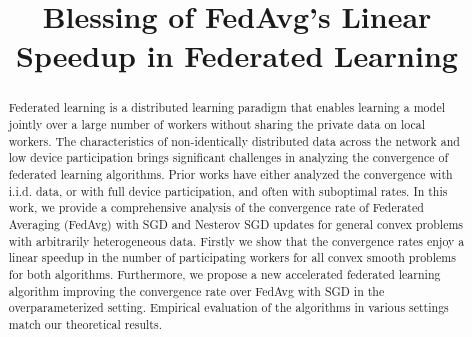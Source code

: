 \documentclass{article}
\title{Blessing of FedAvg's Linear Speedup in Federated Learning}
\author{}
\begin{document}
\maketitle

\begin{abstract}
Federated learning is a distributed learning paradigm that enables learning
a model jointly over a large number of workers without sharing the private
data on local workers. The characteristics of non-identically distributed data
across the network and low device participation brings significant challenges
in analyzing the convergence of federated learning algorithms. Prior works
have either analyzed the convergence with i.i.d. data, or with full device
participation, and often with suboptimal rates. In this work, we provide a
comprehensive analysis of the convergence rate of Federated Averaging (FedAvg)
with SGD and Nesterov SGD updates for general convex problems with arbitrarily
heterogeneous data. Firstly we show that the convergence rates enjoy a linear
speedup in the number of participating workers for all convex smooth problems
for both algorithms. Furthermore, we propose a new accelerated federated
learning algorithm improving the convergence rate over FedAvg with SGD in the
overparameterized setting. Empirical evaluation of the algorithms in various
settings match our theoretical results.
\end{abstract}











\newpage



\appendix

\end{document}
